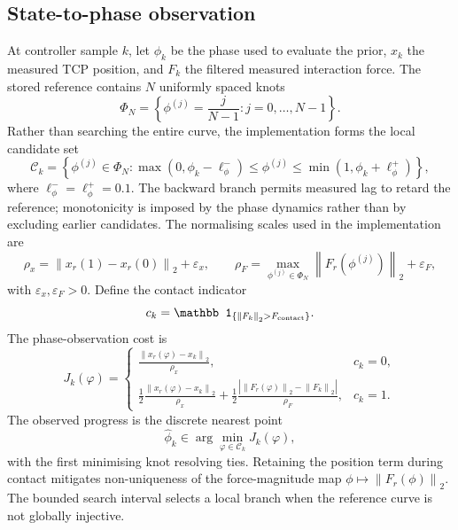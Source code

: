 \documentclass[11pt,a4paper]{article}
\newcommand{\norm}[1]{\left\lVert#1\right\rVert}
\begin{document}
\subsection{State-to-phase observation}
At controller sample $k$, let $\phi_k$ be the phase used to evaluate the prior,
$x_k$ the measured TCP position, and $F_k$ the filtered measured interaction
force.  The stored reference contains $N$ uniformly spaced knots
\begin{equation}
\Phi_N=\left\{\phi^{(j)}=\frac{j}{N-1}:j=0,\ldots,N-1\right\}.
\end{equation}
Rather than searching the entire curve, the implementation forms the local
candidate set
\begin{equation}
\mathcal C_k
=\left\{\phi^{(j)}\in\Phi_N:
\max(0,\phi_k-\ell_\phi^-)\leq\phi^{(j)}
\leq\min(1,\phi_k+\ell_\phi^+)\right\},
\label{eq:phase_candidates}
\end{equation}
where $\ell_\phi^-=\ell_\phi^+=0.1$.  The backward branch permits measured
lag to retard the reference; monotonicity is imposed by the phase dynamics
rather than by excluding earlier candidates.
The normalising scales used in the implementation are
\begin{equation}
\rho_x=\norm{x_r(1)-x_r(0)}_2+\varepsilon_x,\qquad
\rho_F=\max_{\phi^{(j)}\in\Phi_N}\norm{F_r(\phi^{(j)})}_2+\varepsilon_F,
\label{eq:phase_scales}
\end{equation}
with $\varepsilon_x,\varepsilon_F>0$.  Define the contact indicator
\begin{equation}
c_k=\mathbb 1_{\{\norm{F_k}_2>F_{\rm contact}\}}.
\label{eq:contact_indicator}
\end{equation}
The phase-observation cost is
\begin{equation}
J_k(\varphi)=
\begin{cases}
\displaystyle
\frac{\norm{x_r(\varphi)-x_k}_2}{\rho_x},
&c_k=0,\\[2mm]
\displaystyle
\frac{1}{2}\frac{\norm{x_r(\varphi)-x_k}_2}{\rho_x}
+\frac{1}{2}
\frac{\left|\norm{F_r(\varphi)}_2-\norm{F_k}_2\right|}{\rho_F},
&c_k=1.
\end{cases}
\label{eq:phase_observation_cost}
\end{equation}
The observed progress is the discrete nearest point
\begin{equation}
\hat\phi_k\in\arg\min_{\varphi\in\mathcal C_k}J_k(\varphi),
\label{eq:phase_estimator}
\end{equation}
with the first minimising knot resolving ties.  Retaining the position term
during contact mitigates non-uniqueness of the force-magnitude map
$\phi\mapsto\norm{F_r(\phi)}_2$.  The bounded search interval selects a local
branch when the reference curve is not globally injective.
\end{document}
